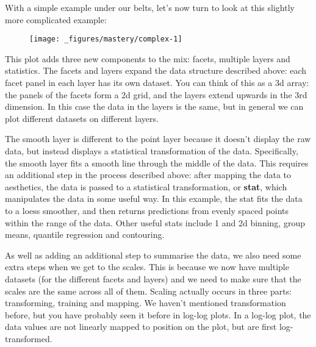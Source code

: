 With a simple example under our belts, let's now turn to look at this
slightly more complicated example:

\begin{Shaded}
\begin{Highlighting}[]
\OperatorTok{+}\StringTok{ }
\StringTok{  }\NormalTok{() }\OperatorTok{+}
\StringTok{  }\NormalTok{() }\OperatorTok{+}\StringTok{ }
\StringTok{  }\NormalTok{(}\OperatorTok{~}
\end{Highlighting}
\end{Shaded}

\begin{figure}[H]
  \centering
  \texttt{[image: \_figures/mastery/complex-1]}
\end{figure}

This plot adds three new components to the mix: facets, multiple layers
and statistics. The facets and layers expand the data structure
described above: each facet panel in each layer has its own dataset. You
can think of this as a 3d array: the panels of the facets form a 2d
grid, and the layers extend upwards in the 3rd dimension. In this case
the data in the layers is the same, but in general we can plot different
datasets on different layers.

The smooth layer is different to the point layer because it doesn't
display the raw data, but instead displays a statistical transformation
of the data. Specifically, the smooth layer fits a smooth line through
the middle of the data. This requires an additional step in the process
described above: after mapping the data to aesthetics, the data is
passed to a statistical transformation, or \textbf{stat}, which
manipulates the data in some useful way. In this example, the stat fits
the data to a loess smoother, and then returns predictions from evenly
spaced points within the range of the data. Other useful stats include 1
and 2d binning, group means, quantile regression and contouring.

As well as adding an additional step to summarise the data, we also need
some extra steps when we get to the scales. This is because we now have
multiple datasets (for the different facets and layers) and we need to
make sure that the scales are the same across all of them. Scaling
actually occurs in three parts: transforming, training and mapping. We
haven't mentioned transformation before, but you have probably seen it
before in log-log plots. In a log-log plot, the data values are not
linearly mapped to position on the plot, but are first log-transformed.

